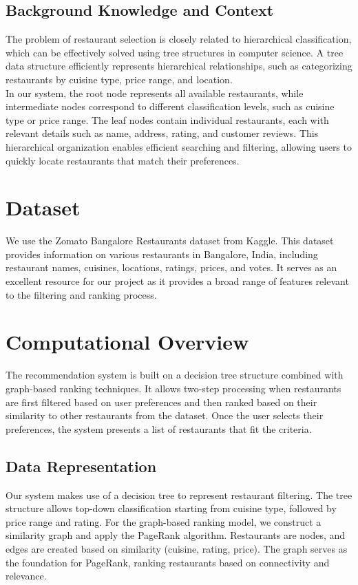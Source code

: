 \documentclass[fontsize=11pt]{article}
\begin{document}
\subsection*{Background Knowledge and Context}
The problem of restaurant selection is closely related to hierarchical classification, which can be effectively solved using tree structures in computer science. A tree data structure efficiently represents hierarchical relationships, such as categorizing restaurants by cuisine type, price range, and location. \\
In our system, the root node represents all available restaurants, while intermediate nodes correspond to different classification levels, such as cuisine type or price range. The leaf nodes contain individual restaurants, each with relevant details such as name, address, rating, and customer reviews. This hierarchical organization enables efficient searching and filtering, allowing users to quickly locate restaurants that match their preferences.


\section*{Dataset}
We use the Zomato Bangalore Restaurants dataset from Kaggle. This dataset provides information on various restaurants in Bangalore, India, including restaurant names, cuisines, locations, ratings, prices, and votes. It serves as an excellent resource for our project as it provides a broad range of features relevant to the filtering and ranking process.

\section*{Computational Overview}
The recommendation system is built on a decision tree structure combined with graph-based ranking techniques. It allows two-step processing when restaurants are first filtered based on user preferences and then ranked based on their similarity to other restaurants from the dataset. Once the user selects their preferences, the system presents a list of restaurants that fit the criteria.

\subsection*{Data Representation}
Our system makes use of a decision tree to represent restaurant filtering. The tree structure allows top-down classification starting from cuisine type, followed by price range and rating. For the graph-based ranking model, we construct a similarity graph and apply the PageRank algorithm. Restaurants are nodes, and edges are created based on similarity (cuisine, rating, price). The graph serves as the foundation for PageRank, ranking restaurants based on connectivity and relevance.
\end{document}
